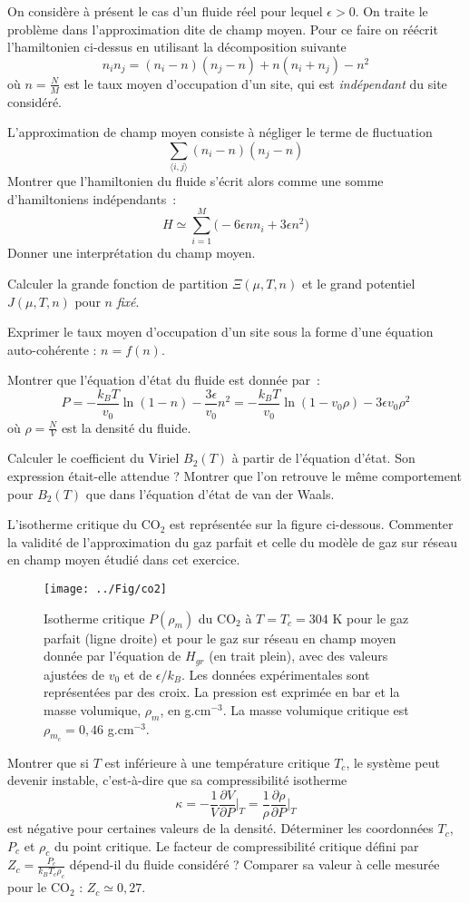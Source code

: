 On considère à présent le cas d'un fluide réel pour lequel $\epsilon>0$. On traite le problème dans l'approximation dite de champ moyen. Pour ce faire on réécrit l'hamiltonien ci-dessus en utilisant la décomposition suivante
$$
n_i n_j = (n_i -n)(n_j -n)+ n(n_i+n_j)-n^2
$$
où $n=\frac{N}{M}$ est le taux moyen d'occupation d'un site, qui est {\it indépendant} du site considéré.

\question
L'approximation de champ moyen consiste à négliger le terme de fluctuation
$$
\sum_{\langle i,j\rangle} (n_i -n)(n_j -n)
$$
Montrer que l'hamiltonien du fluide s'écrit alors comme une somme d'hamiltoniens indépendants~:
$$
H \simeq \sum_{i=1}^{M}\bigg(-6\epsilon n n_i+ 3\epsilon n^2 \bigg)
$$
Donner une interprétation du \og champ moyen\fg.

\question
Calculer la grande fonction de partition $\Xi(\mu,T,n)$ et le grand potentiel $J(\mu,T,n)$ pour $n$ {\it fixé}.

\question
Exprimer le taux moyen d'occupation d'un site sous la forme d'une équation auto-cohérente : $n=f(n)$.

\question
Montrer que l'équation d'état du fluide est donnée par~:
$$
P=-\frac{k_BT}{v_0} \ln(1-n) -\frac{3\epsilon} {v_0}n^2 =-\frac{k_BT}{v_0} \ln(1-v_0\rho) -3\epsilon v_0 \rho^2
$$
où $\rho=\frac{N}{V}$ est la densité du fluide. 

\question
Calculer le coefficient du Viriel $B_2(T)$ à partir de l'équation d'état. Son expression était-elle attendue ? Montrer que l'on retrouve le même comportement pour $B_2(T)$ que dans l'équation d'état de van der Waals.

\question
L'isotherme critique du CO$_2$ est représentée sur la figure ci-dessous. Commenter la validité de l'approximation du gaz parfait et celle du modèle de gaz sur réseau en champ moyen étudié dans cet exercice.


\begin{figure}[h!]
  \centering
  \texttt{[image: ../Fig/co2]}
  \caption{Isotherme critique $P(\rho_m)$ du CO$_2$ à $T=T_c=304$ K
    pour le gaz parfait (ligne droite) et pour le gaz sur réseau en
    champ moyen donnée par l'équation de $H_{gr}$ (en trait
    plein), avec des valeurs ajustées de $v_0$ et de $\epsilon/k_B$. Les données expérimentales
    sont représentées par des croix. La pression est exprimée en bar
    et la masse volumique, $\rho_m$, en g.cm$^{-3}$. La masse
    volumique critique est $\rho_{m_{c}}=0,46$ g.cm$^{-3}$.}
\end{figure}


\question
Montrer que si $T$ est inférieure à une température critique $T_c$, le système peut devenir instable, c'est-à-dire que sa compressibilité isotherme
$$
\kappa =-\frac{1}{V} \frac{\partial V}{\partial P}\bigg|_T= \frac{1}{\rho} \frac{\partial \rho}{\partial P}\bigg|_T
$$
est négative pour certaines valeurs de la densité.  Déterminer les coordonnées $T_c$, $P_c$ et $\rho_c$ du point critique. Le facteur de compressibilité critique défini par $\displaystyle Z_c=\frac{P_c}{k_BT_c\rho_c}$ dépend-il du fluide considéré ? Comparer sa valeur à celle mesurée pour le CO$_2$ : $Z_c\simeq 0,27$.

